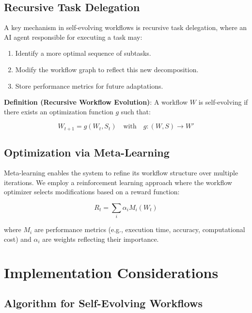 \documentclass{article}
\begin{document}
\subsection{Recursive Task Delegation}

A key mechanism in self-evolving workflows is recursive task delegation, where an AI agent responsible for executing a task may:
\begin{enumerate}
    \item Identify a more optimal sequence of subtasks.
    \item Modify the workflow graph to reflect this new decomposition.
    \item Store performance metrics for future adaptations.
\end{enumerate}

\textbf{Definition (Recursive Workflow Evolution)}: A workflow $W$ is self-evolving if there exists an optimization function $g$ such that:

\begin{equation}
    W_{t+1} = g(W_t, S_t) \quad \text{with} \quad g: (W, S) \to W'
\end{equation}

\subsection{Optimization via Meta-Learning}

Meta-learning enables the system to refine its workflow structure over multiple iterations. We employ a reinforcement learning approach where the workflow optimizer selects modifications based on a reward function:

\begin{equation}
    R_t = \sum_{i} \alpha_i M_i(W_t)
\end{equation}

where $M_i$ are performance metrics (e.g., execution time, accuracy, computational cost) and $\alpha_i$ are weights reflecting their importance.

\section{Implementation Considerations}

\subsection{Algorithm for Self-Evolving Workflows}
\end{document}
